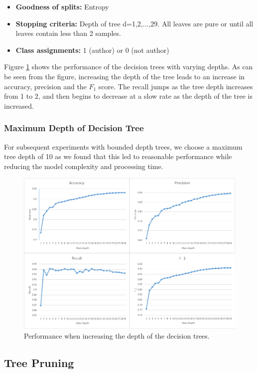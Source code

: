\documentclass[letterpaper,12pt]{article}
\begin{document}
\begin{itemize}
\item\textbf{Goodness of splits:} Entropy
\item\textbf{Stopping criteria:} Depth of tree d={1,2,...,29}. All leaves are pure or until all leaves contain less than 2 samples.
\item\textbf{Class assignments:} 1 (author) or 0 (not author)
\end{itemize}

Figure \ref{fig:depth} shows the performance of the decision trees with varying depths. As can be seen from the figure, increasing the depth of the tree leads to an increase in accuracy, precision and the $F_1$ score. The recall jumps as the tree depth increases from 1 to 2, and then begins to decrease at a slow rate as the depth of the tree is increased. 

\subsubsection{Maximum Depth of Decision Tree}
\label{subsec:dectreemaxdepth}
For subsequent experiments with bounded depth trees, we choose a maximum tree depth of 10 as we found that this led to reasonable performance while reducing the model complexity and processing time.

\begin{figure}[ht!]
\includegraphics[width=\textwidth]{images/trees_result.png}
\caption{Performance when increasing the depth of the decision trees.}\label{fig:depth}
\end{figure}

\subsection{Tree Pruning}
\end{document}
